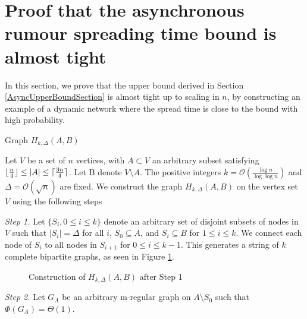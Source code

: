 \section{Proof that the asynchronous rumour spreading time bound is almost tight}
\label{section:AsyncLowerBound}

In this section, we prove that the upper bound derived in Section \ref{AsyncUpperBoundSection} is almost tight up to scaling in $n$, by constructing an example of a dynamic network where the spread time is close to the bound with high probability.

\begin{definition}\label{def:HkAB}
 	Graph $H_{k, \Delta}(A,B)$

	Let $V$ be a set of $n$ vertices, with $A \subset V$ an arbitrary subset satisfying $\lfloor\frac{n}{4}\rfloor \leq |A| \leq \lceil\frac{3n}{4}\rceil$. %
	Let B denote $V \setminus A$. The positive integers $k = \mathcal{O}\left(\frac{\log n}{\log \log n}\right)$ and $\Delta = \mathcal{O}(\sqrt{n})$ are fixed. We construct the graph $H_{k, \Delta}(A,B)$ on the vertex set $V$ using the following steps


	\textit{Step 1.} Let $\{S_i, 0 \leq i \leq k\}$ denote an arbitrary set of disjoint subsets of nodes in $V$ such that $|S_i| = \Delta$ for all $i$, $S_0 \subseteq A$, and $S_i \subseteq B$ for $1 \leq i \leq k$. We connect each node of $S_i$ to all nodes in $S_{i+1}$ for $0 \leq i \leq k - 1$. This generates a string of $k$ complete bipartite graphs, as seen in Figure \ref{fig:HkAB_1}.


    \begin{figure}[h]
        \centering
        
        \caption{Construction of $H_{k, \Delta}(A,B)$ after Step 1}
        \label{fig:HkAB_1}
    \end{figure}
    
	\textit{Step 2.} Let $G_A$ be an arbitrary m-regular %
	graph on $A \setminus S_0$ such that $\Phi(G_A) = \Theta(1)$. %



\end{definition}
